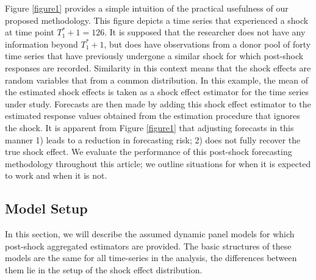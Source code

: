 \documentclass[11pt]{article}
\theoremstyle{definition}
\begin{document}
Figure \ref{figure1} provides a simple intuition of the practical usefulness of our proposed methodology. This figure depicts a time series that experienced a shock at time point $T_1^*+1 = 126$. It is supposed that the researcher does not have any information beyond $T_1^*+1$, but does have observations from a donor pool of forty time series that have previously undergone a similar shock for which post-shock responses are recorded. Similarity in this context means that the shock effects are random variables that from a common distribution. In this example, the mean of the estimated shock effects is taken as a shock effect estimator for the time series under study. Forecasts are then made by adding this shock effect estimator to the estimated response values obtained from the estimation procedure that ignores the shock. It is apparent from Figure \ref{figure1} that adjusting forecasts in this manner 1) leads to a reduction in forecasting risk; 2) does not fully recover the true shock effect. We evaluate the performance of this post-shock forecasting methodology throughout this article; we outline situations for when it is expected to work and when it is not.







\subsection{Model Setup}

\label{modelsetup}

In this section, we will describe the assumed dynamic panel models for which 
post-shock aggregated estimators are provided. The basic structures of these models 
are the same for all time-series in the analysis, the differences between them lie in the setup of the shock effect distribution.
\end{document}
